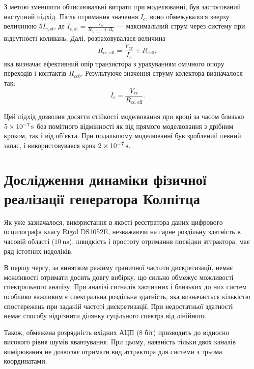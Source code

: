 З метою зменшити обчислювальні витрати при моделюванні, був
застосований наступний підхід. Після отримання значення
$ I_c $, воно обмежувалося зверху величиною
$ 5 I_{c,\mathrm{st}}$,
де
$ I_{c,\mathrm{st}} = \frac{V_{cc}}{R_{c,{\min}}+R_e}$ ---
максимальний струм через систему при відсутності коливань. Далі,
розраховувалася величина
%
\[
  R_{ce,\mathrm{eff}} = \frac{V_{ce}}{I_c} + R_{ce0},
\]
яка визначає ефективний опір транзистора з урахуванням омічного
опору переходів і контактів
$ R_{ce0} $. Результуюче значення струму колектора визначалося так:
%
\[
  I_c = \frac{V_{ce}}{R_{ce,\mathrm{eff}}}.
\]

Цей підхід дозволив досягти стійкості моделювання при кроці
за часом близько
$ \SI{5E-7}{\second} $ без помітного відмінності як від прямого
моделювання з дрібним кроком, так і від об'єкта. При подальшому
моделюванні був зроблений певний запас, і використовувався крок
$ \SI{2E-7}{\second} $.




\section{Дослідження динаміки фізичної реалізації генератора Колпітца} %

Як уже зазначалося, використання в якості реєстратора даних
цифрового осцилографа класу Rigol DS1052E, незважаючи на гарне роздільну здатність
в часовій області ($ \SI{10}{\nano \second} $), швидкість і простоту отримання посвідки
аттрактора, має ряд істотних недоліків.

В першу чергу, за винятком режиму граничної частоти
дискретизації, немає можливості отримати досить довгу вибірку,
що сильно обмежує можливості спектрального аналізу. При аналізі
сигналів хаотичних і близьких до них систем особливо важливим
є спектральна роздільна здатність, яка визначається кількістю спостережень
при заданій частоті дискретизації. При недостатньої здатності
немає способу відрізнити ділянку суцільного спектра від
лінійного.

Також, обмежена розрядність вхідних АЦП (8 біт) призводить до
відносно високого рівня шумів квантування. При цьому, наявність
тільки двох каналів вимірювання не дозволяє отримати вид
аттрактора для системи з трьома координатами.

